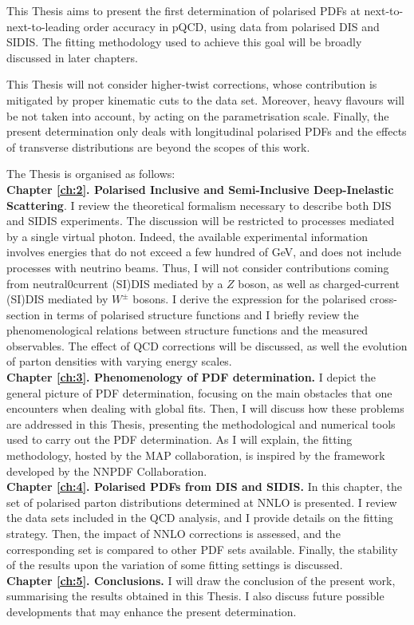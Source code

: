 This Thesis aims to present the first determination of polarised PDFs at next-to-next-to-leading order accuracy in pQCD, using data from polarised DIS and SIDIS. The fitting methodology used to achieve this goal will be broadly discussed in later chapters.%

This Thesis will not consider higher-twist corrections, whose contribution is mitigated by proper kinematic cuts to the data set. Moreover, heavy flavours will be not taken into account, by acting on the parametrisation scale. Finally, the present determination only deals with longitudinal polarised PDFs and the effects of transverse distributions are beyond the scopes of this work.%

The Thesis is organised as follows:\\[10pt]
\begingroup
\textbf{Chapter \ref{ch:2}. Polarised Inclusive and Semi-Inclusive Deep-Inelastic Scattering}. I review the theoretical formalism necessary to describe both DIS and SIDIS experiments. The discussion will be restricted to processes mediated by a single virtual photon. Indeed, the available experimental information involves energies that do not exceed a few hundred of GeV, and does not include processes with neutrino beams. Thus, I will not consider contributions coming from neutral0current (SI)DIS mediated by a $Z$ boson, as well as charged-current (SI)DIS mediated by $W^{\pm}$ bosons. I derive the expression for the polarised cross-section in terms of polarised structure functions and I briefly review the phenomenological relations between structure functions and the measured observables. The effect of QCD corrections will be discussed, as well the evolution of parton densities with varying energy scales.
\\[5pt]
\textbf{Chapter \ref{ch:3}. Phenomenology of PDF determination.} I depict the general picture of PDF determination, focusing on the main obstacles that one encounters when dealing with global fits. Then, I will discuss how these problems are addressed in this Thesis, presenting the methodological and numerical tools used to carry out the PDF determination. As I will explain, the fitting methodology, hosted by the MAP collaboration, is inspired by the framework developed by the NNPDF Collaboration.
\\[5pt]
\textbf{Chapter \ref{ch:4}. Polarised PDFs from DIS and SIDIS.} In this chapter, the set of polarised parton distributions determined at NNLO is presented. I review the data sets included in the QCD analysis, and I provide details on the fitting strategy. Then, the impact of NNLO corrections is assessed, and the corresponding set is compared to other PDF sets available. Finally, the stability of the results upon the variation of some fitting settings is discussed.
\\[5pt]
\textbf{Chapter \ref{ch:5}. Conclusions.} I will draw the conclusion of the present work, summarising the results obtained in this Thesis. I also discuss future possible developments that may enhance the present determination.
\endgroup